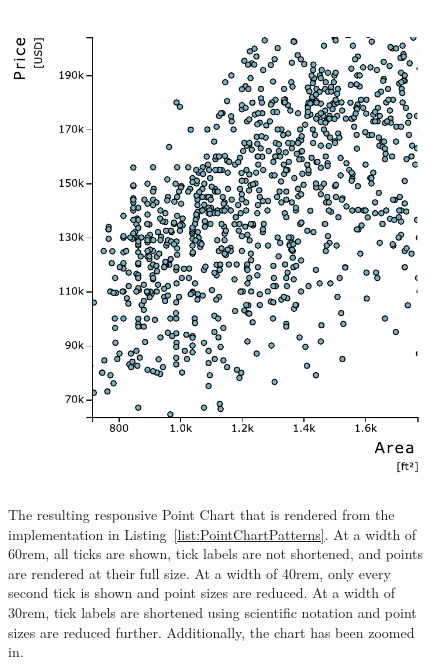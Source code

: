 \begin{figure}[tp]
{  \includegraphics[valign=b,scale=\respscale]{diagrams/respvis-point-30rem-zoomed.pdf}%
  \label{fig:PointChartPatterns30remZoomed}%
}
\caption[Responsive RespVis Point Chart]{%
The resulting responsive Point Chart that is rendered from the
implementation in Listing~\ref{list:PointChartPatterns}.
 At a width of 60rem, all
ticks are shown, tick labels are not shortened, and points are
rendered at their full size.  At
a width of 40rem, only every second tick is shown and point
sizes are reduced.
 At a width of
30rem, tick labels are shortened using scientific notation and point
sizes are reduced further. Additionally, the chart has been zoomed in.
}
\label{fig:PointChartPatterns}
\end{figure}


